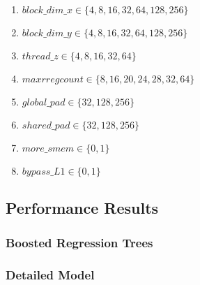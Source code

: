 \begin{enumerate}
\item[] $block\_dim\_x \in \{4, 8, 16, 32, 64, 128,256\}$
\item[] $block\_dim\_y \in \{4, 8, 16, 32, 64, 128,256\}$
\item[] $thread\_z \in \{4, 8, 16, 32, 64\}$
\item[] $maxrregcount \in \{8, 16, 20, 24, 28, 32, 64\}$
\item[] $global\_pad \in \{32, 128, 256\}$
\item[] $shared\_pad \in \{32, 128, 256\}$
\item[] $more\_smem \in \{0, 1\}$
\item[] $bypass\_L1 \in \{0, 1\}$
\end{enumerate}



\subsection{Performance Results}
\subsubsection{Boosted Regression Trees}
\subsubsection{Detailed Model}

